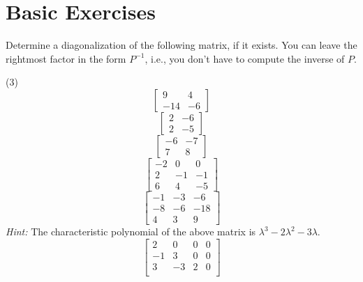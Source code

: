 \section{Basic Exercises}

Determine a diagonalization of the following matrix, if it exists.
You can leave the rightmost factor in the form $P^{-1}$, i.e., you
don't have to compute the inverse of $P$.
\begin{tasks}[style=enumerate](3)
\task
  \begin{displaymath}
    \begin{bmatrix}
      9 & 4 \\
      -14 & -6
    \end{bmatrix}
  \end{displaymath}
\task
  \begin{displaymath}
    \begin{bmatrix}
      2 & -6 \\
      2 & -5
    \end{bmatrix}
  \end{displaymath}
\task
  \begin{displaymath}
    \begin{bmatrix}
      -6 & -7\\
      7 & 8
    \end{bmatrix}
  \end{displaymath}
\task
  \begin{displaymath}
    \begin{bmatrix}
      -2 & 0 & 0 \\
      2 & -1 & -1 \\
      6 & 4 & -5
    \end{bmatrix}
  \end{displaymath}
\task
\begin{displaymath}
  \begin{bmatrix}
    -1 & -3 & -6 \\
    -8 & -6 & -18 \\
    4 & 3 & 9
  \end{bmatrix}
\end{displaymath}
\textit{Hint:} The characteristic polynomial of the above matrix is
$\lambda^{3} - 2 \lambda^{2} - 3 \lambda$.
\task
  \begin{displaymath}
    \begin{bmatrix}
      2 & 0 & 0 & 0 \\
      -1 & 3 & 0 & 0 \\
      3 & -3 & 2 & 0 \\

\end{bmatrix}
\end{displaymath}
\end{tasks}
